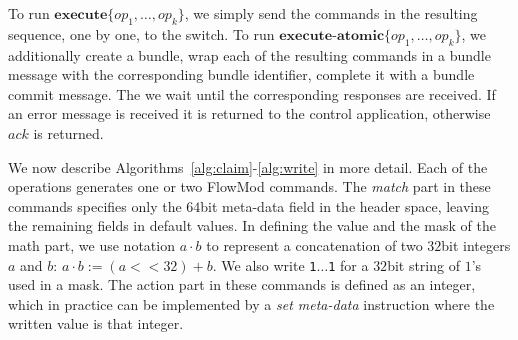 \documentclass[conference]{sigcomm-alternate}
\newcommand{\hide}[1]{}
\newcommand{\concat}[0]{\cdot}
\newcommand{\add}{\textbf{add}\xspace}
\newcommand{\dele}{\textbf{delete}\xspace}
\newcommand{\checko}{\texttt{check\_overlap}\xspace}
\newcommand{\exec}{\textbf{execute}}
\newcommand{\execatomic}{\textbf{execute-atomic}}
\newcommand{\ack}{\textit{ack}}
\begin{document}
To run  $\exec\{op_1,\ldots,op_k\}$, we simply send the commands in
the resulting sequence, one by one, to the switch. 
%
To run  $\execatomic\{op_1,\ldots,op_k\}$, we 
additionally create a bundle, wrap each of the resulting commands in a
bundle message with the corresponding bundle identifier, complete it
with a bundle commit message.
The we wait until the
corresponding responses are received. 
If an error message is received
it is returned to the control application,
otherwise $\ack$ is returned.

We now describe Algorithms~\ref{alg:claim}-\ref{alg:write} in more
detail. 
Each of the operations generates one or two FlowMod commands. 
The \textit{match} part in these commands specifies only the $64$bit meta-data
field in the header space, leaving the remaining fields in default
values.  
In defining the value and the mask of the math part, we 
use notation $a\concat b$ to represent a concatenation of two
$32$bit integers $a$ and $b$: $a\concat b := (a<<32)+b$.
We also write \texttt{1$\ldots$1} for  a $32$bit 
string of $1$'s used in a mask.  
%
The action part in these commands is defined as an integer, which in
practice can be implemented by a \emph{set meta-data} instruction where the written value is that integer.


\hide{
To simplify the presentation we set the FlowMod command field values with integers, according to the following guidelines:
\begin{itemize}

\item {\bf  Flag:} we often use the $\checko$ optional flag value to make the command execution dependent on switch state. In other cases, when the flag value remains zero, we omit the assignment.

\item {\bf  Match:} we consider the match part of an entry to be a ternary string of bounded length, represented by binary strings (integers) named value and mask. In general, the match can be applied to any set of supported packet header fields. In our implementation, the $64$bit meta-data field alone is sufficient. We sometimes use the concatenation of two $32$bit integers, denoted by $a\concat b$, to form one match value or mask, where $a\concat b := (a<<32)+b$.

\item {\bf Action:} we consider the action part of an entry to be an integer, which in practice can be implemented by a \emph{set meta-data} instruction where the written value is that integer.

\end{itemize} 

In addition we use "op" as shortened form to a field that indicates whether the command should $\add$ or $\dele$ the specified flow entry. This corresponds to the FlowMod field named "command" which can receive values \textt{ofpfc\_add} and \texttt{ofpfc\_delete}.
}
\end{document}
